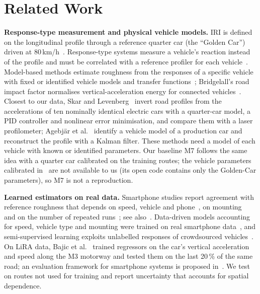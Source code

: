 \section{Related Work}
\label{sec:related}

\textbf{Response-type measurement and physical vehicle models.}
IRI is defined on the longitudinal profile through a reference quarter car (the ``Golden Car'') driven at 80\,km/h~\cite{sayers1986tp45,sayers1995iri,astm_e1926}.
Response-type systems measure a vehicle's reaction instead of the profile and must be correlated with a reference profiler for each vehicle~\cite{sayers1986tp46}.
Model-based methods estimate roughness from the responses of a specific vehicle with fixed or identified vehicle models and transfer functions~\cite{gonzalez2008accel,zhao2017freq}; Bridgelall's road impact factor normalises vertical-acceleration energy for connected vehicles~\cite{bridgelall2014rif}.
Closest to our data, Skar and Levenberg~\cite{skar2024inversion} invert road profiles from the accelerations of ten nominally identical electric cars with a quarter-car model, a PID controller and nonlinear error minimisation, and compare them with a laser profilometer; Agebj\"ar et al.~\cite{agebjar2025fusion} identify a vehicle model of a production car and reconstruct the profile with a Kalman filter.
These methods need a model of each vehicle with known or identified parameters.
Our baseline M7 follows the same idea with a quarter car calibrated on the training routes; the vehicle parameters calibrated in~\cite{skar2024inversion} are not available to us (its open code contains only the Golden-Car parameters), so M7 is not a reproduction.

\textbf{Learned estimators on real data.}
Smartphone studies report agreement with reference roughness that depends on speed, vehicle and phone~\cite{thilak2021}, on mounting~\cite{mounting2026} and on the number of repeated runs~\cite{opara2022roughness}; see also~\cite{hanson2014iri,sattar2018review}.
Data-driven models accounting for speed, vehicle type and mounting were trained on real smartphone data~\cite{sang2024iri}, and semi-supervised learning exploits unlabelled responses of crowdsourced vehicles~\cite{zhang2026semisup,trc2021crowd}.
On LiRA data, Bajic et al.~\cite{bajic2021ml} trained regressors on the car's vertical acceleration and speed along the M3 motorway and tested them on the last 20\,\% of the same road; an evaluation framework for smartphone systems is proposed in~\cite{evalframework2023}.
We test on routes not used for training and report uncertainty that accounts for spatial dependence.

